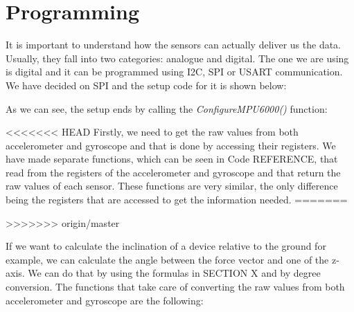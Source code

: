 \section{Programming}
It is important to understand how the sensors can actually deliver us the data. Usually, they fall into two categories: analogue and digital. The one we are using is digital and it can be programmed using I2C, SPI or USART communication. We have decided on SPI and the setup code for it is shown below:



As we can see, the setup ends by calling the \textit{ConfigureMPU6000()} function:



<<<<<<< HEAD
Firstly, we need to get the raw values from both accelerometer and gyroscope and that is done by accessing their registers. We have made separate functions, which can be seen in Code REFERENCE, that read from the registers of the accelerometer and gyroscope and that return the raw values of each sensor. These functions are very similar, the only difference being the registers that are accessed to get the information needed. 
=======

>>>>>>> origin/master



If we want to calculate the inclination of a device relative to the ground for example, we can calculate the angle between the force vector and one of the z-axis. We can do that by using the formulas in SECTION X and by degree conversion. The functions that take care of converting the raw values from both accelerometer and gyroscope are the following:





